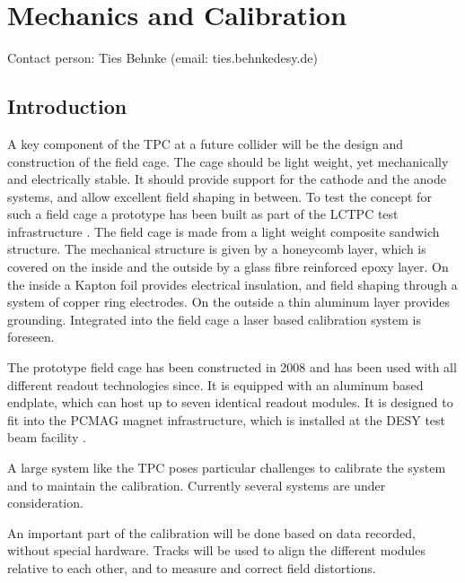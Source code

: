 \section{Mechanics and Calibration}\label{chap:TPC_sec:mechanics}
Contact person: Ties Behnke (email: ties.behnke\@ desy.de)\\

\subsection{Introduction}
A key component of the TPC at a future collider will be the design and construction of the field cage. The cage should be light weight, yet mechanically and electrically stable. It should provide support for the cathode and the anode systems, and allow excellent field shaping in between.
To test the concept for such a field cage a prototype has been built as part of the LCTPC test infrastructure \cite{1748-0221-5-10-P10011}. The field cage is made from a light weight composite sandwich structure. The mechanical structure is given by a honeycomb layer, which is covered on the inside and the outside by a glass fibre reinforced epoxy layer. On the inside a Kapton foil provides electrical insulation, and field shaping through a system of copper ring electrodes. On the outside a thin aluminum layer provides grounding. Integrated into the field cage a laser based calibration system is foreseen.

The prototype field cage has been constructed in 2008 and has been used with all different readout technologies since. It is equipped with an aluminum based endplate, which can host up to seven identical readout modules. It is designed to fit into the PCMAG magnet \cite{Yamamoto199475} infrastructure, which is installed at the DESY test beam facility \cite{DESY2TB}.


A large system like the TPC poses particular challenges to calibrate the system and to maintain the calibration. Currently several systems are under consideration.

An important part of the calibration will be done based on data recorded, without special hardware. Tracks will be used to align the different modules relative to each other, and to measure and correct field distortions.


